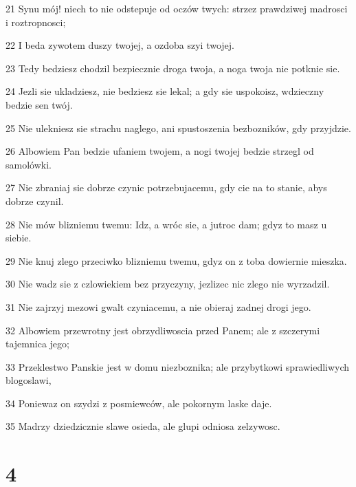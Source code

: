 \par 21 Synu mój! niech to nie odstepuje od oczów twych: strzez prawdziwej madrosci i roztropnosci;
\par 22 I beda zywotem duszy twojej, a ozdoba szyi twojej.
\par 23 Tedy bedziesz chodzil bezpiecznie droga twoja, a noga twoja nie potknie sie.
\par 24 Jezli sie ukladziesz, nie bedziesz sie lekal; a gdy sie uspokoisz, wdzieczny bedzie sen twój.
\par 25 Nie ulekniesz sie strachu naglego, ani spustoszenia bezbozników, gdy przyjdzie.
\par 26 Albowiem Pan bedzie ufaniem twojem, a nogi twojej bedzie strzegl od samolówki.
\par 27 Nie zbraniaj sie dobrze czynic potrzebujacemu, gdy cie na to stanie, abys dobrze czynil.
\par 28 Nie mów blizniemu twemu: Idz, a wróc sie, a jutroc dam; gdyz to masz u siebie.
\par 29 Nie knuj zlego przeciwko blizniemu twemu, gdyz on z toba dowiernie mieszka.
\par 30 Nie wadz sie z czlowiekiem bez przyczyny, jezlizec nic zlego nie wyrzadzil.
\par 31 Nie zajrzyj mezowi gwalt czyniacemu, a nie obieraj zadnej drogi jego.
\par 32 Albowiem przewrotny jest obrzydliwoscia przed Panem; ale z szczerymi tajemnica jego;
\par 33 Przeklestwo Panskie jest w domu niezboznika; ale przybytkowi sprawiedliwych blogoslawi,
\par 34 Poniewaz on szydzi z posmiewców, ale pokornym laske daje.
\par 35 Madrzy dziedzicznie slawe osieda, ale glupi odniosa zelzywosc.

\chapter{4}

